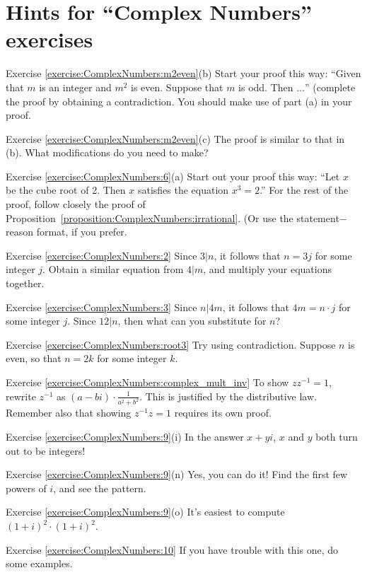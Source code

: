 \section{Hints for ``Complex Numbers'' exercises}
\label{sec:ComplexNumbers:Hints} 


\noindent Exercise \ref{exercise:ComplexNumbers:m2even}(b)
Start your proof this way: ``Given that $m$ is an integer and $m^2$ is even. Suppose that $m$ is odd. Then $\ldots$'' (complete the proof by obtaining a contradiction. You should make use of part (a) in your proof.

\noindent Exercise \ref{exercise:ComplexNumbers:m2even}(c)
The proof is similar to that in (b).  What modifications do you need to make?

\noindent Exercise \ref{exercise:ComplexNumbers:6}(a)
 Start out your proof this way: ``Let $x$ be the cube root of 2.  Then $x$ satisfies the equation $x^3 = 2$.'' For the rest of the proof, follow closely the proof of Proposition~\ref{proposition:ComplexNumbers:irrational}. (Or use the statement$-$reason format, if you prefer.

\noindent Exercise \ref{exercise:ComplexNumbers:2}
Since $3 | n$, it follows that $n=3j$ for some integer $j$. Obtain a similar equation from $4|m$, and multiply your equations together.


\noindent Exercise \ref{exercise:ComplexNumbers:3}
Since $n | 4m$, it follows that $4m=n\cdot j$ for some integer $j$. Since $12 | n$, then what can you substitute for $n$?

\noindent Exercise \ref{exercise:ComplexNumbers:root3}
Try using contradiction. Suppose $n$ is even, so that $n = 2k$ for some integer $k$.

\noindent Exercise \ref{exercise:ComplexNumbers:complex_mult_inv}
To show $zz^{-1}=1$, rewrite $z^{-1}$ as $(a-bi) \cdot \frac{1}{a^{2}+b^{2}}$. This is justified by the distributive law.  Remember also that showing $z^{-1}z=1$ requires its own proof.


\noindent Exercise \ref{exercise:ComplexNumbers:9}(i)
In the answer $x + yi$, $x$ and $y$ both turn out to be integers!

\noindent Exercise \ref{exercise:ComplexNumbers:9}(n)
Yes, you can do it! Find the first few powers of $i$, and see the pattern.

\noindent Exercise \ref{exercise:ComplexNumbers:9}(o)
It's easiest to compute $(1+i)^2 \cdot (1+i)^2$.

\noindent Exercise \ref{exercise:ComplexNumbers:10}
If you have trouble with this one, do some examples.

